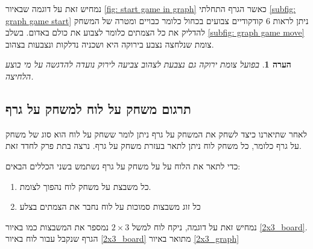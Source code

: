 \documentclass[12pt,leqno]{article}
\theoremstyle{theoremdd}
\newtheorem{comm}{הערה}[section]
\begin{document}
נמחיש זאת על דוגמה שבאיור
\ref{fig: start game in graph}
כאשר הגרף התחלתי
\ref{subfig: graph game start}
ניתן לראות
$6$
קודקודיים
צבועים בכחול כלומר כבויים ומטרה של המשחק להדליק את כל הצמתים כלומר לצבוע את כולם באדום.
בשלב 
\ref{subfig: graph game move}
צומת שנלחצה נצבע בירוקה היא ושכניה נדלקות ונצבעות בצהוב.

\begin{comm}
    בפועל צומת ירוקה גם נצבעת לצהוב צביעה לירוק נועדה להדגשה על מי בוצע הלחיצה.
\end{comm}

\subsection{תרגום משחק על לוח למשחק על גרף}
לאחר שתיארנו כיצד לשחק את המשחק על גרף ניתן לומר ששחק על לוח
הוא סוג של משחק על גרף
כלומר, כל משחק 
לוח ניתן לתאר בעזרת משחק על גרף.
נרצה בתת פרק לחדד זאת.

כדי לתאר את הלוח על על משחק על גרף נשתמש בשני הכללים הבאים:
\begin{enumerate}
    \item 
    כל משבצת על משחק לוח נהפוך לצומת.
    \item 
    כל זוג משבצות סמוכות על לוח נחבר את הצמתים בצלע
\end{enumerate}

נמחיש זאת על דוגמה, ניקח לוח למשל
$2 \times 3$
נמספר את המשבצות כמו באיור
\ref{2x3_board}.
הגרף שנקבל עבור לוח באיור
\ref{2x3_board}
מתואר באיור
\ref{2x3_graph}
\end{document}
